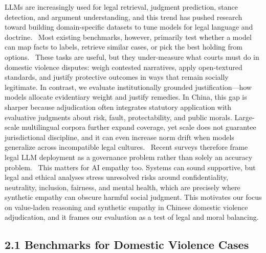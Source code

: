 LLMs are increasingly used for legal retrieval, judgment prediction, stance detection, and argument understanding, and this trend has pushed research toward building domain-specific datasets to tune models for legal language and doctrine.~\cite{ref29} Most existing benchmarks, however, primarily test whether a model can map facts to labels, retrieve similar cases, or pick the best holding from options.~\cite{ref30} These tasks are useful, but they under-measure what courts must do in domestic violence disputes: weigh contested narratives, apply open-textured standards, and justify protective outcomes in ways that remain socially legitimate. In contrast, we evaluate institutionally grounded justification---how models allocate evidentiary weight and justify remedies. In China, this gap is sharper because adjudication often integrates statutory application with evaluative judgments about risk, fault, protectability, and public morals. Large-scale multilingual corpora further expand coverage, yet scale does not guarantee jurisdictional discipline, and it can even increase norm drift when models generalize across incompatible legal cultures.~\cite{ref31} Recent surveys therefore frame legal LLM deployment as a governance problem rather than solely an accuracy problem.~\cite{ref32} This matters for AI empathy too. Systems can sound supportive, but legal and ethical analyses stress unresolved risks around confidentiality, neutrality, inclusion, fairness, and mental health, which are precisely where synthetic empathy can obscure harmful social judgment. This motivates our focus on value-laden reasoning and synthetic empathy in Chinese domestic violence adjudication, and it frames our evaluation as a test of legal and moral balancing.

\hypertarget{benchmarks-for-domestic-violence-cases}{%
\subsection{\texorpdfstring{\textbf{2.1 Benchmarks for Domestic Violence Cases}}{2.1 Benchmarks for Domestic Violence Cases}}\label{benchmarks-for-domestic-violence-cases}}

